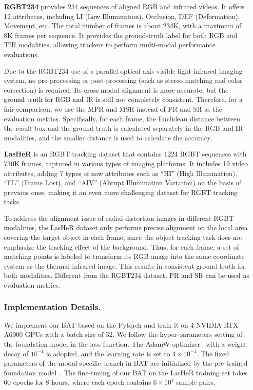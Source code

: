 \documentclass[letterpaper]{article} %
\begin{document}
\textbf{RGBT234} provides 234 sequences of aligned RGB and infrared videos. It offers 12 attributes, including LI (Low Illumination), Occlusion, DEF (Deformation), Movement, etc. The total number of frames is about 234K, with a maximum of 8K frames per sequence.  It provides the ground-truth label for both RGB and TIR modalities, allowing trackers to perform multi-modal performance evaluations.

Due to the RGBT234 use of a parallel optical axis visible light-infrared imaging system, no pre-processing or post-processing (such as stereo matching and color correction) is required. Its cross-modal alignment is more accurate, but the ground truth for RGB and IR is still not completely consistent. Therefore, for a fair comparison, we use the MPR and MSR instead of PR and SR as the evaluation metrics. Specifically, for each frame, the Euclidean distance between the result box and the ground truth is calculated separately in the RGB and IR modalities, and the smaller distance is used to calculate the accuracy.

\textbf{LasHeR} is an RGBT tracking dataset that contains 1224 RGBT sequences with
730K frames, captured in various types of imaging platforms. It includes 19 video attributes, adding 7 types of new attributes such as ``HI'' (High Illumination), ``FL'' (Frame Lost), and ``AIV'' (Abrupt Illumination Variation) on the basis of previous ones, making it an even more challenging dataset for RGBT tracking tasks.

To address the alignment issue of radial distortion images in different RGBT modalities, the LasHeR dataset only performs precise alignment on the local area covering the target object in each frame, since the object tracking task does not emphasize the tracking effect of the background. Thus, for each frame, a set of matching points is labeled to transform its RGB image into the same coordinate system as the thermal infrared image. This results in consistent ground truth for both modalities. Different from the RGBT234 dataset, PR and SR can be used as evaluation metrics.

\subsubsection{Implementation Details.}
We implement our BAT based on the Pytorch and train it on 4 NVIDIA RTX A6000 GPUs with a batch size of 32.
We follow the hyper-parameters setting of the foundation model in the loss function. The AdamW optimizer~\cite{loshchilov2019adamw} with a weight decay of $10^{-4}$ is adopted, and the learning rate is set to $4\times 10^{-4}$.
The fixed parameters of the modal-specific branch in BAT are initialized by the pre-trained foundation model~\cite{ye2022joint}. The fine-tuning of our BAT on the LasHeR training set takes 60 epochs for 8 hours, where each epoch contains $6\times 10^{4}$ sample pairs.
\end{document}
